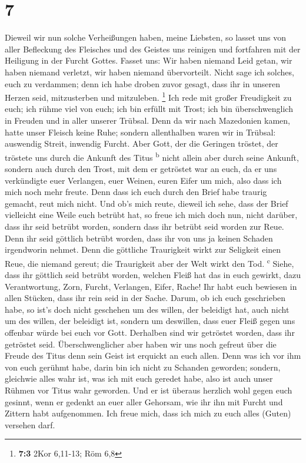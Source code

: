 \hypertarget{section-6}{%
\section{7}\label{section-6}}

 Dieweil wir nun solche Verheißungen haben, meine
Liebsten, so lasset uns von aller Befleckung des Fleisches und des
Geistes uns reinigen und fortfahren mit der Heiligung in der Furcht
Gottes.  Fasset uns: Wir haben niemand Leid getan, wir
haben niemand verletzt, wir haben niemand übervorteilt. 
Nicht sage ich solches, euch zu verdammen; denn ich habe droben zuvor
gesagt, dass ihr in unseren Herzen seid, mitzusterben und mitzuleben.
\footnote{\textbf{7:3} 2Kor 6,11-13; Röm 6,8}  Ich rede
mit großer Freudigkeit zu euch; ich rühme viel von euch; ich bin erfüllt
mit Trost; ich bin überschwenglich in Freuden und in aller unserer
Trübsal.  Denn da wir nach Mazedonien kamen, hatte unser
Fleisch keine Ruhe; sondern allenthalben waren wir in Trübsal: auswendig
Streit, inwendig Furcht.  Aber Gott, der die Geringen
tröstet, der tröstete uns durch die Ankunft des Titus
\textsuperscript{b}  nicht allein aber durch seine
Ankunft, sondern auch durch den Trost, mit dem er getröstet war an euch,
da er uns verkündigte euer Verlangen, euer Weinen, euren Eifer um mich,
also dass ich mich noch mehr freute.  Denn dass ich euch
durch den Brief habe traurig gemacht, reut mich nicht. Und ob's mich
reute, dieweil ich sehe, dass der Brief vielleicht eine Weile euch
betrübt hat,  so freue ich mich doch nun, nicht darüber,
dass ihr seid betrübt worden, sondern dass ihr betrübt seid worden zur
Reue. Denn ihr seid göttlich betrübt worden, dass ihr von uns ja keinen
Schaden irgendworin nehmet.  Denn die göttliche
Traurigkeit wirkt zur Seligkeit einen Reue, die niemand gereut; die
Traurigkeit aber der Welt wirkt den Tod. \textsuperscript{c}
 Siehe, dass ihr göttlich seid betrübt worden, welchen
Fleiß hat das in euch gewirkt, dazu Verantwortung, Zorn, Furcht,
Verlangen, Eifer, Rache! Ihr habt euch bewiesen in allen Stücken, dass
ihr rein seid in der Sache.  Darum, ob ich euch
geschrieben habe, so ist's doch nicht geschehen um des willen, der
beleidigt hat, auch nicht um des willen, der beleidigt ist, sondern um
deswillen, dass euer Fleiß gegen uns offenbar würde bei euch vor Gott.
 Derhalben sind wir getröstet worden, dass ihr getröstet
seid. Überschwenglicher aber haben wir uns noch gefreut über die Freude
des Titus denn sein Geist ist erquickt an euch allen. 
Denn was ich vor ihm von euch gerühmt habe, darin bin ich nicht zu
Schanden geworden; sondern, gleichwie alles wahr ist, was ich mit euch
geredet habe, also ist auch unser Rühmen vor Titus wahr geworden.
 Und er ist überaus herzlich wohl gegen euch gesinnt,
wenn er gedenkt an euer aller Gehorsam, wie ihr ihn mit Furcht und
Zittern habt aufgenommen.  Ich freue mich, dass ich mich
zu euch alles (Guten) versehen darf.

